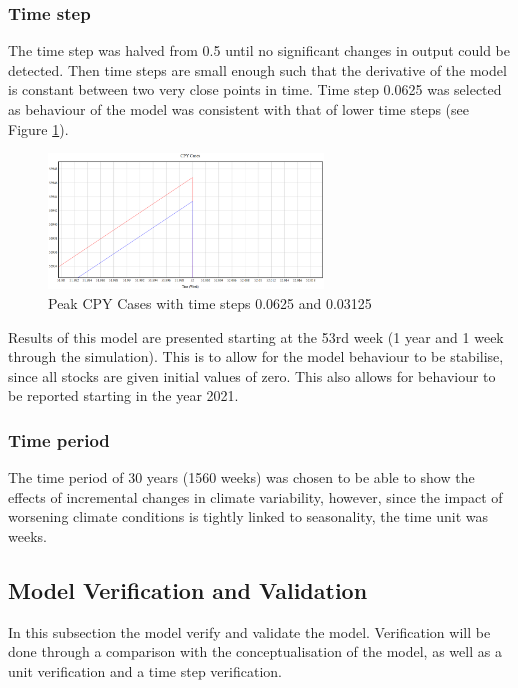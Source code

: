 \subsubsection{Time step}
The time step was halved from 0.5 until no significant changes in output could be detected. Then time steps are small enough such that the derivative of the model is constant between two very close points in time. Time step 0.0625 was selected as behaviour of the model was consistent with that of lower time steps (see Figure \ref{fig:cpy cases with time step}).

\begin{figure}[h!]
\centering
\includegraphics[width=0.65\textwidth]{images/timestep.PNG}
\caption{Peak CPY Cases with time steps 0.0625 and 0.03125}
\label{fig:cpy cases with time step}
\end{figure}

Results of this model are presented starting at the 53rd week (1 year and 1 week through the simulation). This is to allow for the model behaviour to be stabilise, since all stocks are given initial values of zero. This also allows for behaviour to be reported starting in the year 2021.

\subsubsection{Time period}
The time period of 30 years (1560 weeks) was chosen to be able to show the effects of incremental changes in climate variability, however, since the impact of worsening climate conditions is tightly linked to seasonality, the time unit was weeks. %

\subsection{Model Verification and Validation}
In this subsection the model verify and validate the model. Verification will be done through a comparison with the conceptualisation of the model, as well as a unit verification and a time step verification. 


